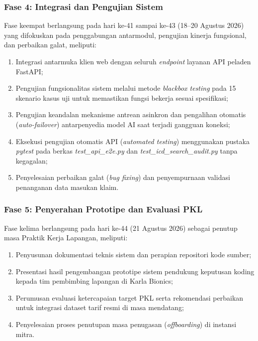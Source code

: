 \subsubsection{Fase 4: Integrasi dan Pengujian Sistem}
Fase keempat berlangsung pada hari ke-41 sampai ke-43 (18--20 Agustus 2026) yang difokuskan pada penggabungan antarmodul, pengujian kinerja fungsional, dan perbaikan galat, meliputi:
\begin{enumerate}
  \item Integrasi antarmuka klien web dengan seluruh \textit{endpoint} layanan API peladen FastAPI;
  \item Pengujian fungsionalitas sistem melalui metode \textit{blackbox testing} pada 15 skenario kasus uji untuk memastikan fungsi bekerja sesuai spesifikasi;
  \item Pengujian keandalan mekanisme antrean asinkron dan pengalihan otomatis (\textit{auto-failover}) antarpenyedia model AI saat terjadi gangguan koneksi;
  \item Eksekusi pengujian otomatis API (\textit{automated testing}) menggunakan pustaka \textit{pytest} pada berkas \textit{test\_api\_e2e.py} dan \textit{test\_icd\_search\_audit.py} tanpa kegagalan;
  \item Penyelesaian perbaikan galat (\textit{bug fixing}) dan penyempurnaan validasi penanganan data masukan klaim.
\end{enumerate}

\subsubsection{Fase 5: Penyerahan Prototipe dan Evaluasi PKL}
Fase kelima berlangsung pada hari ke-44 (21 Agustus 2026) sebagai penutup masa Praktik Kerja Lapangan, meliputi:
\begin{enumerate}
  \item Penyusunan dokumentasi teknis sistem dan perapian repositori kode sumber;
  \item Presentasi hasil pengembangan prototipe sistem pendukung keputusan koding kepada tim pembimbing lapangan di Karla Bionics;
  \item Perumusan evaluasi ketercapaian target PKL serta rekomendasi perbaikan untuk integrasi dataset tarif resmi di masa mendatang;
  \item Penyelesaian proses penutupan masa penugasan (\textit{offboarding}) di instansi mitra.
\end{enumerate}
